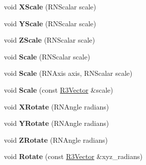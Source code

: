 \begin{DoxyCompactItemize}
\item 
void {\bfseries X\+Scale} (R\+N\+Scalar scale)\hypertarget{class_r4_matrix_a6d2b691b0fe4cdb397c06513781eada5}{}\label{class_r4_matrix_a6d2b691b0fe4cdb397c06513781eada5}

\item 
void {\bfseries Y\+Scale} (R\+N\+Scalar scale)\hypertarget{class_r4_matrix_a2cecb6ba16d1e551c54d22cd77dd0452}{}\label{class_r4_matrix_a2cecb6ba16d1e551c54d22cd77dd0452}

\item 
void {\bfseries Z\+Scale} (R\+N\+Scalar scale)\hypertarget{class_r4_matrix_a938588c64bf51e9fc6bc3bb7dd3a5182}{}\label{class_r4_matrix_a938588c64bf51e9fc6bc3bb7dd3a5182}

\item 
void {\bfseries Scale} (R\+N\+Scalar scale)\hypertarget{class_r4_matrix_a311aaacf56f8ae9bda7b7ff5b1e8dda1}{}\label{class_r4_matrix_a311aaacf56f8ae9bda7b7ff5b1e8dda1}

\item 
void {\bfseries Scale} (R\+N\+Axis axis, R\+N\+Scalar scale)\hypertarget{class_r4_matrix_a4bb1203a339f8ce2e9fd8bfbc35fc99b}{}\label{class_r4_matrix_a4bb1203a339f8ce2e9fd8bfbc35fc99b}

\item 
void {\bfseries Scale} (const \hyperlink{class_r3_vector}{R3\+Vector} \&scale)\hypertarget{class_r4_matrix_a3b654c529a8ceb76083fdae309cfc8e6}{}\label{class_r4_matrix_a3b654c529a8ceb76083fdae309cfc8e6}

\item 
void {\bfseries X\+Rotate} (R\+N\+Angle radians)\hypertarget{class_r4_matrix_a0393505b1aa6b3176aa6f2f02982922a}{}\label{class_r4_matrix_a0393505b1aa6b3176aa6f2f02982922a}

\item 
void {\bfseries Y\+Rotate} (R\+N\+Angle radians)\hypertarget{class_r4_matrix_afd7fbec34f176580c567926ae69cf841}{}\label{class_r4_matrix_afd7fbec34f176580c567926ae69cf841}

\item 
void {\bfseries Z\+Rotate} (R\+N\+Angle radians)\hypertarget{class_r4_matrix_a4e74bbe34b1f1cc45e178aba260742be}{}\label{class_r4_matrix_a4e74bbe34b1f1cc45e178aba260742be}

\item 
void {\bfseries Rotate} (const \hyperlink{class_r3_vector}{R3\+Vector} \&xyz\+\_\+radians)\hypertarget{class_r4_matrix_a562fd83d678ee2d5c6d5e0dc87e7a742}{}\label{class_r4_matrix_a562fd83d678ee2d5c6d5e0dc87e7a742}


\end{DoxyCompactItemize}

